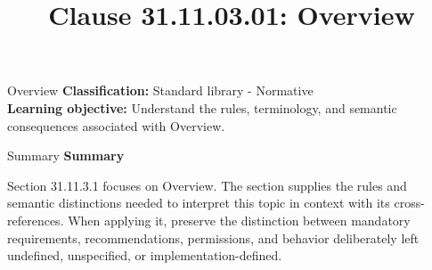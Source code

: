\documentclass[10pt,letterpaper]{article}
\title{Clause 31.11.03.01: Overview}
\author{}
\date{}
\begin{document}
\maketitle
\begin{CornellOverviewBox}{Overview}
\textbf{Classification:} Standard library - Normative\\[2pt]
\textbf{Learning objective:} Understand the rules, terminology, and semantic consequences associated with Overview.
\end{CornellOverviewBox}\begin{CornellSummaryBox}{Summary}
{\sffamily\bfseries\color{Accent} Summary}\par\vspace{3pt}Section 31.11.3.1 focuses on Overview. The section supplies the rules and semantic distinctions needed to interpret this topic in context with its cross-references. When applying it, preserve the distinction between mandatory requirements, recommendations, permissions, and behavior deliberately left undefined, unspecified, or implementation-defined.
\end{CornellSummaryBox}
\end{document}
